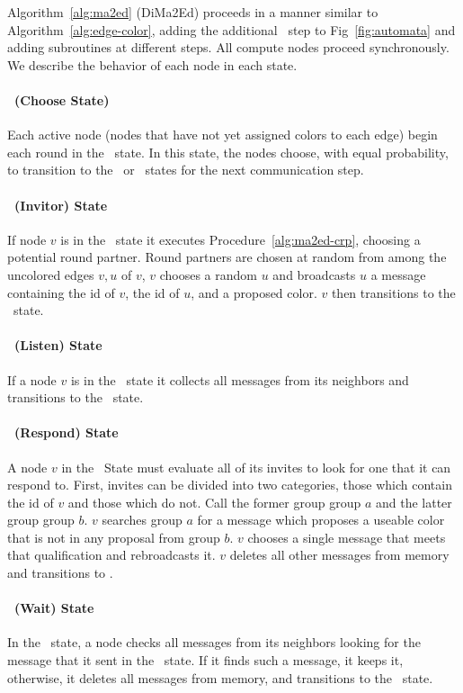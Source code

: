 Algorithm~\ref{alg:ma2ed} (DiMa2Ed) proceeds in a manner similar to Algorithm~\ref{alg:edge-color}, adding the additional \cEd\ step to Fig~\ref{fig:automata} and adding subroutines at different steps. All compute nodes proceed synchronously. We describe the behavior of each node in each state.

\paragraph{\cCd\ (Choose State)}
Each active node (nodes that have not yet assigned colors to each edge) begin each round in the \cCd\ state. In this state, the nodes choose, with equal probability, to transition to the \cId\ or \cLd\ states for the next communication step.

\paragraph{\cId\ (Invitor) State}
If node $v$ is in the \cId\ state it executes Procedure~\ref{alg:ma2ed-crp}, choosing a potential round partner. Round partners are chosen at random from among the uncolored edges $v,u$ of $v$, $v$ chooses a random $u$ and broadcasts $u$ a message containing the id of $v$, the id of $u$, and a proposed color. $v$ then transitions to the \cWd\ state.

\paragraph{\cLd\ (Listen) State}
If a node $v$ is in the \cLd\ state it collects all messages from its neighbors and transitions to the \cRd\ state. 

\paragraph{\cRd\ (Respond) State}
A node $v$ in the \cRd\ State must evaluate all of its invites to look for one that it can respond to. First, invites can be divided into two categories, those which contain the id of $v$ and those which do not. Call the former group group $a$ and the latter group group $b$. $v$ searches group $a$ for a message which proposes a useable color that is not in any proposal from group $b$. $v$ chooses a single message that meets that qualification and rebroadcasts it. $v$ deletes all other messages from memory and transitions to \cUd.

\paragraph{\cWd\ (Wait) State}
In the \cWd\ state, a node checks all messages from its neighbors looking for the message that it sent in the \cId\ state. If it finds such a message, it keeps it, otherwise, it deletes all messages from memory, and transitions to the \cUd\ state.

